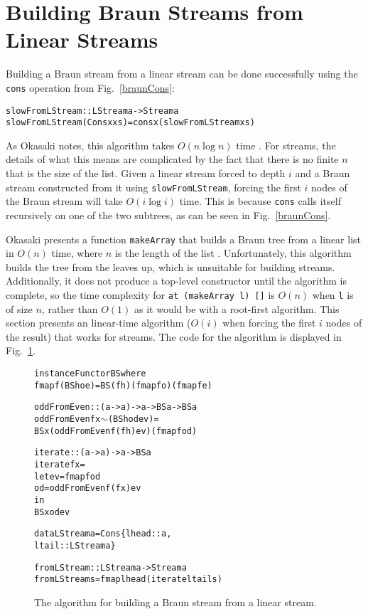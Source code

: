 \documentclass[envcountsect]{llncs}
\begin{document}
\section{Building Braun Streams from Linear Streams}
\label{iterSect}

Building a Braun stream from a linear stream can be done successfully using the {\tt cons} operation from Fig.~\ref{braunCons}:

\begin{alltt}
slowFromLStream :: LStream a -> Stream a
slowFromLStream (Cons x xs) = cons x (slowFromLStream xs)
\end{alltt}

As Okasaki notes, this algorithm takes $O(n \log n)$ time \cite{okasakiBraun}.
For streams, the details of what this means are complicated by the fact that there is no finite $n$ that is the size of the list.
Given a linear stream forced to depth $i$ and a Braun stream constructed from it using {\tt slowFromLStream}, forcing the first $i$ nodes of the Braun stream will take $O(i \log i)$ time.
This is because {\tt cons} calls itself recursively on one of the two subtrees, as can be seen in Fig.~\ref{braunCons}.

Okasaki presents a function {\tt makeArray} that builds a Braun tree from a linear list in $O(n)$ time, where $n$ is the length of the list \cite{okasakiBraun}.
Unfortunately, this algorithm builds the tree from the leaves up, which is unsuitable for building streams.
Additionally, it does not produce a top-level constructor until the algorithm is complete, so the time complexity for {\tt at (makeArray l) []} is $O(n)$ when {\tt l} is of size $n$, rather than $O(1)$ as it would be with a root-first algorithm.
This section presents an linear-time algorithm ($O(i)$ when forcing the first $i$ nodes of the result) that works for streams.
The code for the algorithm is displayed in Fig.~\ref{iterateCode}.

\begin{figure}
\begin{alltt}
instance Functor BS where
    fmap f (BS h o e) = BS (f h) (fmap f o) (fmap f e)

oddFromEven :: (a -> a) -> a -> BS a -> BS a
oddFromEven f x  \(\sim\)(BS h od ev) =
    BS x (oddFromEven f (f h) ev) (fmap f od)

iterate :: (a -> a) -> a -> BS a
iterate f x =
    let ev = fmap f od
        od = oddFromEven f (f x) ev
    in
      BS x od ev

data LStream a = Cons \{lhead::a,
                       ltail::LStream a\}

fromLStream :: LStream a -> Stream a
fromLStream s = fmap lhead (iterate ltail s)
\end{alltt}
\caption{The algorithm for building a Braun stream from a linear stream.}
\label{iterateCode}
\end{figure}
\end{document}
